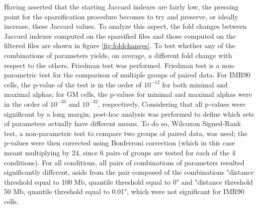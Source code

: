 Having asserted that the starting Jaccard indexes are fairly low, the pressing point for the sparsification procedure becomes to try and preserve, or ideally increase, these Jaccard values. To analyze this aspect, the fold changes between Jaccard indexes computed on the sparsified files and those computed on the filtered files are shown in figure \ref{fig:foldchanges}. To test whether any of the combinations of parameters yields, on average, a different fold change with respect to the others, Friedman test was performed. Friedman test is a non-parametric test for the comparison of multiple groups of paired data. For IMR90 cells, the p-value of the test is in the order of $10^{-12}$ for both minimal and maximal alphas; for GM cells, the p-values for minimal and maximal alphas were in the order of $10^{-33}$ and $10^{-32}$, respectively. Considering that all p-values were significant by a long margin, post-hoc analysis was performed to define which sets of parameters actually have different means. To do so, Wilcoxon Signed-Rank test, a non-parametric test to compare two groups of paired data, was used; the p-values were then corrected using Bonferroni correction (which in this case meant multiplying by 24, since 6 pairs of groups are tested for each of the 4 conditions). For all conditions, all pairs of combinations of parameters resulted significantly different, aside from the pair composed of the combinations "distance threshold equal to 100 Mb, quantile threshold equal to 0" and "distance threshold 50 Mb, quantile threshold equal to 0.01", which were not significant for IMR90 cells. 






